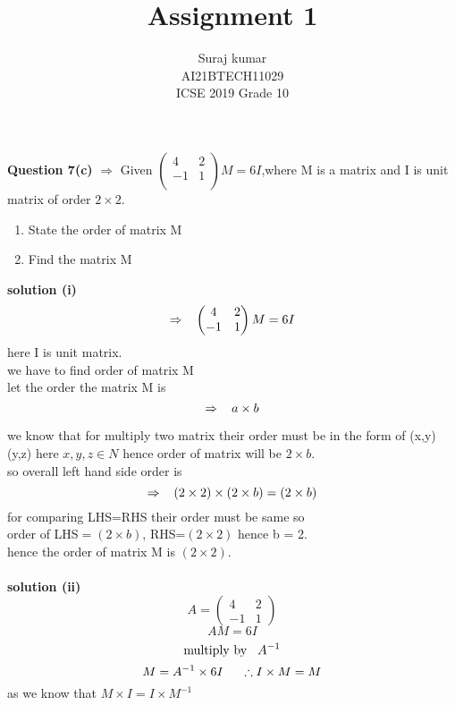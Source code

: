\documentclass[journal,12pt,twocolumn]{IEEEtran}
\title{Assignment 1}
\author{Suraj kumar \\ \normalsize AI21BTECH11029\\\vspace*{20pt} \Large ICSE 2019 Grade 10}
\newcommand{\myvec}[1]{\ensuremath{\begin{pmatrix}#1\end{pmatrix}}}
\begin{document}
\maketitle
\textbf{Question 7(c)} $\Rightarrow$ Given $\myvec{
     4 & 2 \\
     -1 & 1 \\
      }M=6I $,where M is a matrix and I is unit matrix of order $2\times 2.$
		\begin{enumerate}[label=(\roman*)]
		\item State the order of matrix M
		\item Find the matrix M
	\end{enumerate}	
 \textbf{solution (i) } 
 \begin{equation}
  \Rightarrow  \hspace{3mm} \myvec{
     4 & 2 \\
     -1 & 1 
      }M=6I
      \end{equation}
    here I is unit matrix.\\
    we have to find order of matrix M\\
    let the order the matrix M is  $$ \Rightarrow \hspace{3mm} a\times b$$
      
      we know that for multiply two matrix their order must be in the form of  (x,y) (y,z)  here $x,y,z \in N$
      hence order of matrix will be $2\times b$.\\
      so overall left hand side order is  $$\Rightarrow \hspace{3mm} (2\times 2)\times(2\times b) =(2\times b)$$
      for comparing LHS=RHS their order must be same so \\
      order of LHS$=(2\times b)$,
      RHS=$(2\times 2)$  hence b = 2.\\
      hence the order of matrix M is $(2\times 2).$\\\\

\textbf{solution (ii)}\\
\begin{equation}
    A=\myvec{
      4 & 2\\
      -1 & 1
     }
     \end{equation}
     \begin{equation}
       AM=6I
     \end{equation}
    \begin{equation}
    \text{multiply by}\hspace{3mm} A^{-1}
    \end{equation}
    \begin{equation}
    M=A^{-1}\times 6I \hspace{5mm} \therefore I\times M=M
    \end{equation}
    as we know that  $M \times I=I\times M^{-1}$
    
\end{document}
